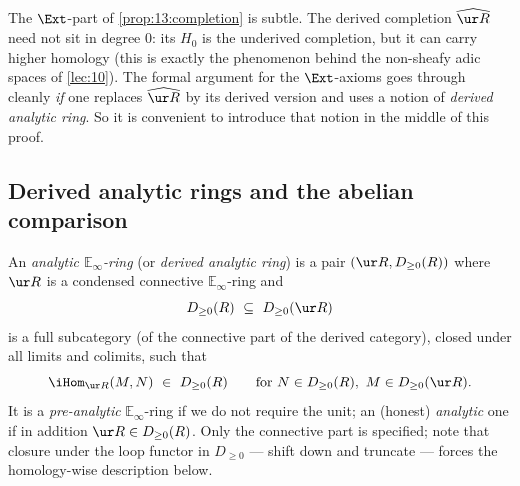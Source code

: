 \begin{remark}
\label{rmk:13:derived-needed}
The $\Ext$-part of \cref{prop:13:completion} is subtle. The derived completion
$\widehat{\ur R}$ need not sit in degree $0$: its $H_0$ is the underived
completion, but it can carry higher homology (this is exactly the phenomenon
behind the non-sheafy adic spaces of \cref{lec:10}). The formal argument for the
$\Ext$-axioms goes through cleanly \emph{if} one replaces $\widehat{\ur R}$ by
its derived version and uses a notion of \emph{derived analytic ring}. So it is
convenient to introduce that notion in the middle of this proof.
\end{remark}

\subsection{Derived analytic rings and the abelian comparison}

\begin{definition}
\label{def:13:derived-analytic-ring}
An \emph{analytic $\mathbb{E}_\infty$-ring} (or \emph{derived analytic ring}) is a
pair $(\ur R, D_{\ge 0}(R))$ where $\ur R$ is a condensed connective
$\mathbb{E}_\infty$-ring and
\begin{equation*}
D_{\ge 0}(R)\ \subseteq\ D_{\ge 0}(\ur R)
\end{equation*}
is a full subcategory (of the connective part of the derived category), closed
under all limits and colimits, such that
\begin{equation*}
\iHom_{\ur R}(M,N)\ \in\ D_{\ge 0}(R)\qquad\text{for }N\in D_{\ge 0}(R),\ M\in D_{\ge 0}(\ur R).
\end{equation*}
It is a \emph{pre-analytic} $\mathbb{E}_\infty$-ring if we do not require the
unit; an (honest) \emph{analytic} one if in addition $\ur R\in D_{\ge 0}(R)$.
Only the connective part is specified; note that closure under the loop functor
in $D_{\ge 0}$ --- shift down and truncate --- forces the homology-wise
description below.
\end{definition}

